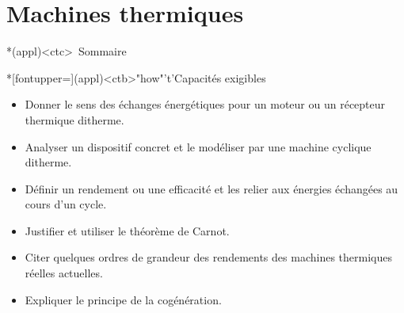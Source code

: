 \documentclass[../../main/main.tex]{subfiles}
\begin{document}
\setcounter{chapter}{4}


\chapter{Machines thermiques}

\vspace*{\fill}

\begin{tcn}*(appl)<ctc>{\iconsomm~Sommaire}
	\let\item\olditem
	\vspace{-15pt}
	\minitoc
	\vspace{-25pt}
\end{tcn}

\begin{tcn}*[fontupper=\small](appl)<ctb>"how"'t'{Capacités exigibles}
	\begin{itemize}[label=\rcheck]
		\item Donner le sens des échanges énergétiques pour un moteur ou un
		      récepteur thermique ditherme.

		\item Analyser un dispositif concret et le modéliser par une machine
		      cyclique ditherme.

		\item Définir un rendement ou une efficacité et les relier aux énergies
		      échangées au cours d'un cycle.

		\item Justifier et utiliser le théorème de Carnot.

		\item Citer quelques ordres de grandeur des rendements des machines
		      thermiques réelles actuelles.

		\item Expliquer le principe de la cogénération.
	\end{itemize}
\end{tcn}

\vspace*{\fill}

\newpage
\end{document}
